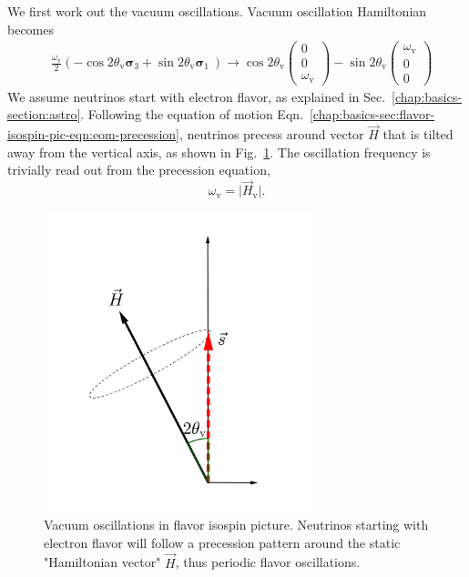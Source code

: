 We first work out the vacuum oscillations. Vacuum oscillation Hamiltonian becomes
\begin{align*}
&\frac{\omega_{\mathrm v} }{2}\left( - \cos 2\theta_{\mathrm v } \boldsymbol{\sigma}_3  + \sin 2\theta_{\mathrm{v}} \boldsymbol{\sigma}_1\ \right)
\to  \cos 2\theta_{\mathrm v}\begin{pmatrix}
0\\
0\\
\omega_{\mathrm v}
\end{pmatrix} -\sin 2\theta_{\mathrm v}\begin{pmatrix}
\omega_{\mathrm v}\\
0\\
0
\end{pmatrix}
\end{align*}
We assume neutrinos start with electron flavor, as explained in Sec.~\ref{chap:basics-section:astro}. Following the equation of motion Eqn.~\ref{chap:basics-sec:flavor-isospin-pic-eqn:eom-precession}, neutrinos precess around vector $\vec H$ that is tilted away from the vertical axis, as shown in Fig.~\ref{chap:basics-sec:flavor-isospin-pic-fig:flavor-isospin-vac-osc}. The oscillation frequency is trivially read out from the precession equation,
\begin{equation*}
    \omega_{\mathrm v} = \lvert \vec H_{\mathrm v} \rvert.
\end{equation*}


\begin{figure}
    \centering
    \vspace*{-20pt}
    \includegraphics[width=0.7\textwidth]{chapters/assets/basics/flavor-isospin-vac-osc}
    \caption{Vacuum oscillations in flavor isospin picture. Neutrinos starting with electron flavor will follow a precession pattern around the static "Hamiltonian vector" $\vec H$, thus periodic flavor oscillations.}
    \label{chap:basics-sec:flavor-isospin-pic-fig:flavor-isospin-vac-osc}
\end{figure}


